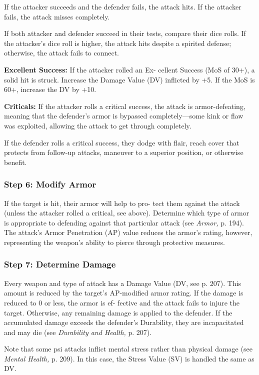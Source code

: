 If the attacker succeeds and the defender fails, 
the attack hits. If the attacker fails, the attack 
misses completely.

If both attacker and defender succeed in their 
tests, compare their dice rolls. If the attacker's 
dice roll is higher, the attack hits despite a spirited 
defense; otherwise, the attack fails to connect.

\textbf{Excellent Success:} If the attacker rolled an Ex-
cellent Success (MoS of 30+), a solid hit is struck. 
Increase the Damage Value (DV) inflicted by +5. If 
the MoS is 60+, increase the DV by +10.

\textbf{Criticals:} If the attacker rolls a critical success, 
the attack is armor-defeating, meaning that the 
defender's armor is bypassed completely—some 
kink or flaw was exploited, allowing the attack to 
get through completely.

If the defender rolls a critical success, they 
dodge with flair, reach cover that protects from 
follow-up attacks, maneuver to a superior position, 
or otherwise benefit.

\subsubsection{Step 6: Modify Armor}

If the target is hit, their armor will help to pro-
tect them against the attack (unless the attacker 
rolled a critical, see above). Determine which type 
of armor is appropriate to defending against that 
particular attack (see \textit{Armor,} p. 194). The attack's 
Armor Penetration (AP) value reduces the armor's 
rating, however, representing the weapon's ability 
to pierce through protective measures.

\subsubsection{Step 7: Determine Damage}

Every weapon and type of attack has a Damage 
Value (DV, see p. 207). This amount is reduced 
by the target's AP-modified armor rating. If the 
damage is reduced to 0 or less, the armor is ef-
fective and the attack fails to injure the target. 
Otherwise, any remaining damage is applied to the 
defender. If the accumulated damage exceeds the 
defender's Durability, they are incapacitated and 
may die (see \textit{Durability and Health,} p. 207).

Note that some psi attacks inflict mental stress 
rather than physical damage (see \textit{Mental Health,} p. 
209). In this case, the Stress Value (SV) is handled 
the same as DV.

